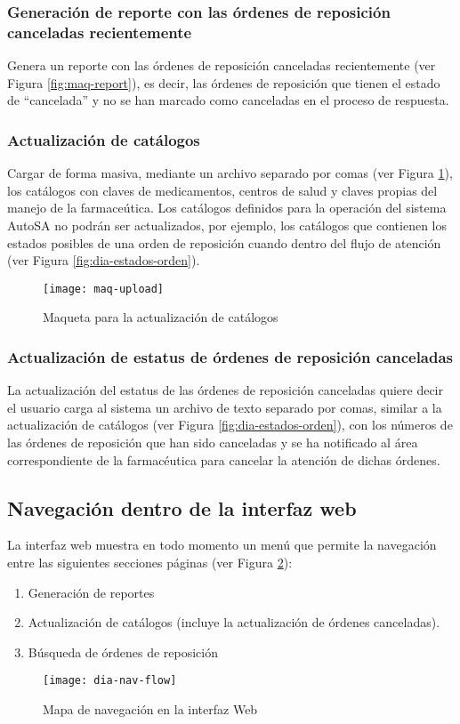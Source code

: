 \subsubsection{Generación de reporte con las órdenes de reposición canceladas recientemente}
Genera un reporte con las órdenes de reposición canceladas recientemente (ver Figura \ref{fig:maq-report}), es decir, las órdenes de reposición que tienen el estado de “cancelada” y no se han marcado como canceladas en el proceso de respuesta.

\subsubsection{Actualización de catálogos}
Cargar de forma masiva, mediante un archivo separado por comas (ver Figura \ref{fig:maq-upload}), los catálogos con claves de medicamentos, centros de salud y claves propias del manejo de la farmaceútica. Los catálogos definidos para la operación del sistema AutoSA no podrán ser actualizados, por ejemplo, los catálogos que contienen los estados posibles de una orden de reposición cuando dentro del flujo de atención (ver Figura \ref{fig:dia-estados-orden}).
\begin{figure}[h]
  \centering
  \texttt{[image: maq-upload]}
  \caption{Maqueta para la actualización de catálogos}
  \label{fig:maq-upload}
\end{figure}

\subsubsection{Actualización de estatus de órdenes de reposición canceladas}
La actualización del estatus de las órdenes de reposición canceladas quiere decir el usuario carga al sistema un archivo de texto separado por comas, similar a la actualización de catálogos (ver Figura \ref{fig:dia-estados-orden}), con los números de las órdenes de reposición que han sido canceladas y se ha notificado al área correspondiente de la farmacéutica para cancelar la atención de dichas órdenes.

\subsection{Navegación dentro de la interfaz web}
La interfaz web muestra en todo momento un menú que permite la navegación entre las siguientes secciones páginas (ver Figura \ref{fig:dia-nav-flow}):
\begin{enumerate}
  \item Generación de reportes
  \item Actualización de catálogos (incluye la actualización de órdenes canceladas).
  \item Búsqueda de órdenes de reposición
\end{enumerate}
\begin{figure}[h]
  \centering
  \texttt{[image: dia-nav-flow]}
  \caption{Mapa de navegación en la interfaz Web}
  \label{fig:dia-nav-flow}
\end{figure}



